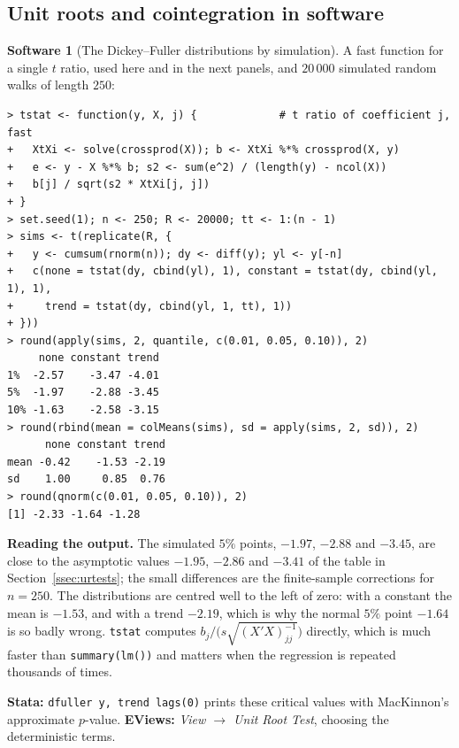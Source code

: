 \documentclass[11pt,a4paper]{article}
\numberwithin{equation}{section}
\theoremstyle{definition}
\newtheorem{software}[thm]{Software}
\begin{document}
\subsection{Unit roots and cointegration in software}
\label{ssec:software12}

\begin{software}[The Dickey--Fuller distributions by simulation]
\label{sw:dfsim}
A fast function for a single $t$ ratio, used here and in the next panels, and $20\,000$ simulated random walks of length $250$:
{\small\begin{verbatim}
> tstat <- function(y, X, j) {             # t ratio of coefficient j, fast
+   XtXi <- solve(crossprod(X)); b <- XtXi %*% crossprod(X, y)
+   e <- y - X %*% b; s2 <- sum(e^2) / (length(y) - ncol(X))
+   b[j] / sqrt(s2 * XtXi[j, j])
+ }
> set.seed(1); n <- 250; R <- 20000; tt <- 1:(n - 1)
> sims <- t(replicate(R, {
+   y <- cumsum(rnorm(n)); dy <- diff(y); yl <- y[-n]
+   c(none = tstat(dy, cbind(yl), 1), constant = tstat(dy, cbind(yl, 1), 1),
+     trend = tstat(dy, cbind(yl, 1, tt), 1))
+ }))
> round(apply(sims, 2, quantile, c(0.01, 0.05, 0.10)), 2)
     none constant trend
1%  -2.57    -3.47 -4.01
5%  -1.97    -2.88 -3.45
10% -1.63    -2.58 -3.15
> round(rbind(mean = colMeans(sims), sd = apply(sims, 2, sd)), 2)
      none constant trend
mean -0.42    -1.53 -2.19
sd    1.00     0.85  0.76
> round(qnorm(c(0.01, 0.05, 0.10)), 2)
[1] -2.33 -1.64 -1.28
\end{verbatim}}
\textbf{Reading the output.} The simulated $5\%$ points, $-1.97$, $-2.88$ and $-3.45$, are close to the asymptotic values $-1.95$, $-2.86$ and $-3.41$ of the table in
Section~\ref{ssec:urtests}; the small differences are the finite-sample corrections for $n = 250$. The distributions are centred well to the left of zero:
with a constant the mean is $-1.53$, and with a trend $-2.19$, which is why the normal $5\%$ point $-1.64$ is so badly wrong. \texttt{tstat} computes
$b_j/\bigl(s\sqrt{(X'X)^{-1}_{jj}}\bigr)$ directly, which is much faster than \texttt{summary(lm())} and matters when the regression is repeated thousands of times.

\textbf{Stata:} \texttt{dfuller y, trend lags(0)} prints these critical values with MacKinnon's approximate $p$-value. \textbf{EViews:} \emph{View $\to$ Unit Root
Test}, choosing the deterministic terms.
\end{software}
\end{document}
